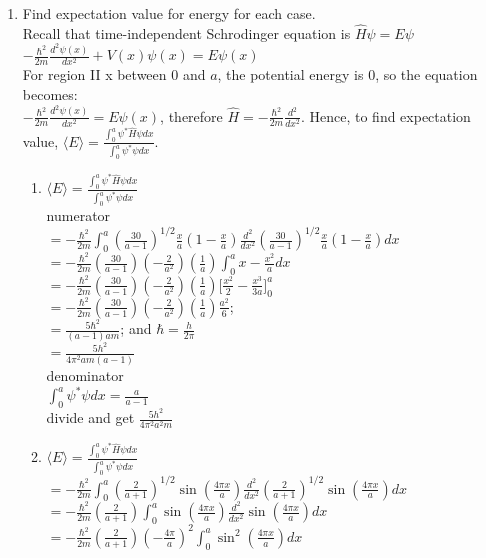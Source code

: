 \documentclass{article}
\begin{document}
\begin{enumerate}
\item Find expectation value for energy for each case. 
\\ Recall that time-independent Schrodinger equation is $\hat{H}\psi=E\psi$ 
\\ $-\frac{\hbar^2}{2m}\frac{d^2\psi(x)}{dx^2}+V(x)\psi(x)=E\psi(x)$
\\ For region II x between 0 and $a$, the potential energy is 0, so the equation becomes:
\\ $-\frac{\hbar^2}{2m}\frac{d^2\psi(x)}{dx^2}=E\psi(x)$, therefore $\hat{H}=-\frac{\hbar^2}{2m}\frac{d^2}{dx^2}$. Hence, to find expectation value, $\langle E\rangle=\frac{\int_0^a \psi^*\hat{H}\psi dx}{\int_0^a \psi^*\psi dx}$.

\begin{enumerate}
\item $\langle E\rangle=\frac{\int_0^a \psi^*\hat{H}\psi dx}{\int_0^a \psi^*\psi dx}$
\\ numerator
\\ $= -\frac{\hbar^2}{2m}\int_0^a (\frac{30}{a-1})^{1/2}\frac{x}{a}(1-\frac{x}{a})\frac{d^2}{dx^2}(\frac{30}{a-1})^{1/2}\frac{x}{a}(1-\frac{x}{a}) dx$
\\ $= -\frac{\hbar^2}{2m}(\frac{30}{a-1}) (-\frac{2}{a^2}) (\frac{1}{a}) \int_0^a x-\frac{x^2}{a} dx$
\\ $= -\frac{\hbar^2}{2m}(\frac{30}{a-1}) (-\frac{2}{a^2}) (\frac{1}{a}) \Big[\frac{x^2}{2}-\frac{x^3}{3a}\Big]_0^a$
\\ $= -\frac{\hbar^2}{2m}(\frac{30}{a-1}) (-\frac{2}{a^2}) (\frac{1}{a}) \frac{a^2}{6}$; 
\\ $= \frac{5\hbar^2}{(a-1)am}$; and $\hbar =\frac{h}{2\pi}$
\\ $= \frac{5h^2}{4\pi^2am(a-1)}$
\\ denominator
\\ $\int_0^a \psi^*\psi dx=\frac{a}{a-1}$
\\divide and get $\frac{5h^2}{4\pi^2a^2m}$
\item $\langle E\rangle=\frac{\int_0^a \psi^*\hat{H}\psi dx}{\int_0^a \psi^*\psi dx}$
\\ $= -\frac{\hbar^2}{2m}\int_0^a (\frac{2}{a+1})^{1/2}\sin(\frac{4\pi x}{a})\frac{d^2}{dx^2}(\frac{2}{a+1})^{1/2}\sin(\frac{4\pi x}{a}) dx$
\\ $= -\frac{\hbar^2}{2m}(\frac{2}{a+1})\int_0^a \sin(\frac{4\pi x}{a})\frac{d^2}{dx^2}\sin(\frac{4\pi x}{a}) dx$
\\ $= -\frac{\hbar^2}{2m}(\frac{2}{a+1})(-\frac{4\pi}{a})^2\int_0^a \sin^2(\frac{4\pi x}{a}) dx$

\end{enumerate}
\end{enumerate}
\end{document}
